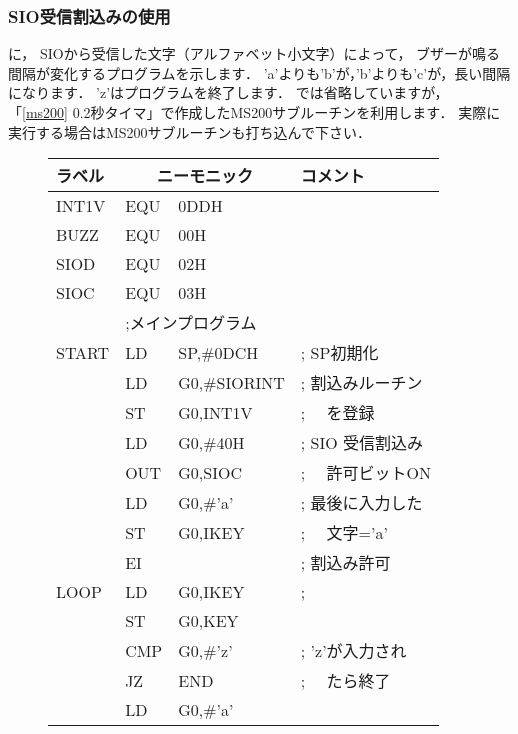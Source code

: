 \subsubsection{SIO受信割込みの使用}
に，
SIOから受信した文字（アルファベット小文字）によって，
ブザーが鳴る間隔が変化するプログラムを示します．
'a'よりも'b'が，'b'よりも'c'が，長い間隔になります．
'z'はプログラムを終了します．
では省略していますが，
「\ref{ms200} 0.2秒タイマ」で作成したMS200サブルーチンを利用します．
実際に実行する場合はMS200サブルーチンも打ち込んで下さい．

\begin{figure}[btp]
{\small\tt\begin{center}
\begin{tabular}{|l|l l l|} \hline
ラベル & \multicolumn{2}{|c}{ニーモニック} & コメント  \\
\hline
INT1V   & EQU     & 0DDH           & \\
BUZZ    & EQU     & 00H            & \\
SIOD    & EQU     & 02H            & \\
SIOC    & EQU     & 03H            & \\
        & \multicolumn{3}{|l|}{;メインプログラム}        \\
START   & LD      & SP,\#0DCH      & ; SP初期化\\
        & LD      & G0,\#SIORINT   & ; 割込みルーチン\\
        & ST      & G0,INT1V       & ; 　を登録\\
        & LD      & G0,\#40H       & ; SIO 受信割込み\\
        & OUT     & G0,SIOC        & ; 　許可ビットON\\
        & LD      & G0,\#'a'       & ; 最後に入力した\\
        & ST      & G0,IKEY        & ; 　文字='a'\\
        & EI      &                & ; 割込み許可\\
LOOP    & LD      & G0,IKEY        & ; \\
        & ST      & G0,KEY         & \\
        & CMP     & G0,\#'z'       & ; 'z'が入力され\\
        & JZ      & END            & ; 　たら終了\\
        & LD      & G0,\#'a'       & \\

\end{tabular}
\end{center}}
\end{figure}
